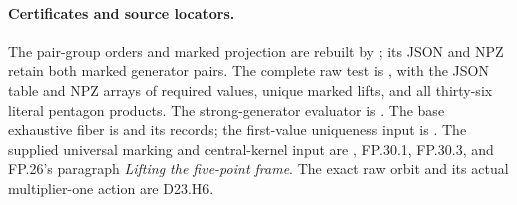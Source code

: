 \paragraph{Certificates and source locators.}
The pair-group orders and marked projection are rebuilt
by ; its JSON
and NPZ retain both marked generator pairs. The complete
raw test is
, with
the JSON table and NPZ arrays of required values, unique
marked lifts, and all thirty-six literal pentagon products.
The strong-generator evaluator is
.
The base exhaustive fiber is
 and its records;
the first-value uniqueness input is
.
The supplied universal marking and central-kernel input are
,
FP.30.1, FP.30.3, and FP.26's paragraph
\emph{Lifting the five-point frame}. The exact raw orbit
and its actual multiplier-one action are D23.H6.
